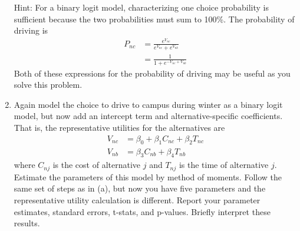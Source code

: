 \documentclass[11pt,letterpaper]{article}
\begin{document}
\begin{enumerate}[label=\alph*., leftmargin=*]
	Hint: For a binary logit model, characterizing one choice probability is sufficient because the two probabilities must sum to 100\%. The probability of driving is
	\begin{align*}
		P_{nc} &= \frac{e^{V_{nc}}}{e^{V_{nc}} + e^{V_{nb}}} \\
		&= \frac{1}{1 + e^{-V_{nc} + V_{nb}}}
	\end{align*}
	Both of these expressions for the probability of driving may be useful as you solve this problem.

	\item Again model the choice to drive to campus during winter as a binary logit model, but now add an intercept term and alternative-specific coefficients. That is, the representative utilities for the alternatives are
	\begin{align*}
		V_{nc} &= \beta_0 + \beta_1 C_{nc} + \beta_2 T_{nc} \\
		V_{nb} &= \beta_3 C_{nb} + \beta_4 T_{nb}
	\end{align*}
	where $C_{nj}$ is the cost of alternative $j$ and $T_{nj}$ is the time of alternative $j$. Estimate the parameters of this model by method of moments. Follow the same set of steps as in (a), but now you have five parameters and the representative utility calculation is different. Report your parameter estimates, standard errors, t-stats, and p-values. Briefly interpret these results.


\end{enumerate}
\end{document}

